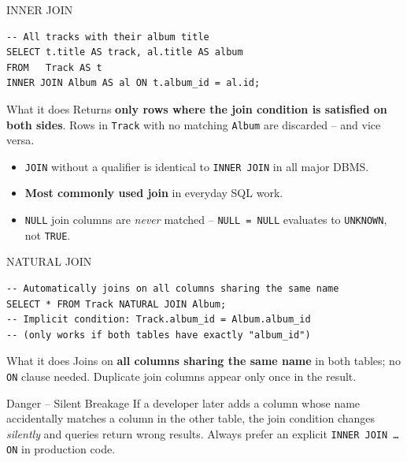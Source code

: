 \begin{frame}[fragile]{INNER JOIN}
  \begin{center}\end{center}

  \begin{lstlisting}[style=sqlstyle]
-- All tracks with their album title
SELECT t.title AS track, al.title AS album
FROM   Track AS t
INNER JOIN Album AS al ON t.album_id = al.id;
  \end{lstlisting}

  \begin{block}{What it does}
    Returns \textbf{only rows where the join condition is satisfied on both sides}.
    Rows in \texttt{Track} with no matching \texttt{Album} are discarded -- and vice versa.
  \end{block}

  \begin{itemize}
    \item \texttt{JOIN} without a qualifier is identical to \texttt{INNER JOIN} in all major DBMS.
    \item \textbf{Most commonly used join} in everyday SQL work.
    \item \texttt{NULL} join columns are \emph{never} matched -- \texttt{NULL = NULL} evaluates to
          \texttt{UNKNOWN}, not \texttt{TRUE}.
  \end{itemize}
\end{frame}

\begin{frame}[fragile]{NATURAL JOIN}
  \begin{lstlisting}[style=sqlstyle]
-- Automatically joins on all columns sharing the same name
SELECT * FROM Track NATURAL JOIN Album;
-- Implicit condition: Track.album_id = Album.album_id
-- (only works if both tables have exactly "album_id")
  \end{lstlisting}

  \begin{block}{What it does}
    Joins on \textbf{all columns sharing the same name} in both tables; no \texttt{ON} clause needed.
    Duplicate join columns appear only once in the result.
  \end{block}

  \begin{alertblock}{Danger -- Silent Breakage}
    If a developer later adds a column whose name accidentally matches a column in the other table,
    the join condition changes \emph{silently} and queries return wrong results.
    Always prefer an explicit \texttt{INNER JOIN \ldots ON} in production code.
  \end{alertblock}
\end{frame}

